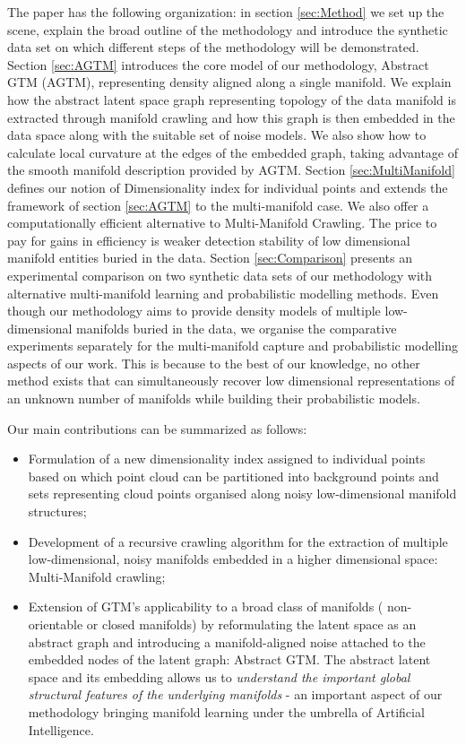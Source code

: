 The paper has the following organization: in section \ref{sec:Method} we set up the scene, explain the broad outline of the methodology and introduce the synthetic data set on which different steps of the methodology  will be demonstrated. Section \ref{sec:AGTM} 
introduces the core model of our methodology, Abstract GTM (AGTM), representing density aligned along a single manifold. We explain how the abstract latent space graph representing topology of the data manifold is extracted through manifold crawling and how this graph is then embedded in the data space along with the suitable set of noise models. We also show how to calculate local curvature at the edges of the embedded graph, taking advantage of the smooth manifold description provided by AGTM.
 Section \ref{sec:MultiManifold} defines our notion of Dimensionality index for individual points and extends the framework of section \ref{sec:AGTM} to the multi-manifold case. We also offer a computationally efficient alternative to Multi-Manifold Crawling. The price to pay for gains in efficiency is weaker detection stability of low dimensional manifold entities buried in the data.
 Section \ref{sec:Comparison} presents an experimental comparison on two synthetic data sets of our methodology with alternative multi-manifold learning and probabilistic modelling methods. Even though our methodology aims to provide density models of multiple low-dimensional manifolds buried in the data, we organise the comparative experiments separately for the multi-manifold capture and probabilistic modelling aspects of our work. This is because to the best of our knowledge, no other method exists that can simultaneously recover low dimensional representations of an unknown number of manifolds while building their probabilistic models.
 
 
Our main contributions can be summarized as follows:
\begin{itemize}
    \item Formulation of a new dimensionality index assigned to individual points based on which point cloud can be partitioned into background points and sets representing cloud points organised along noisy low-dimensional manifold structures;
    \item Development of a recursive crawling algorithm for the extraction of multiple low-dimensional, noisy manifolds embedded in a higher dimensional space: Multi-Manifold crawling;
    \item Extension of GTM's applicability to a broad class of manifolds (\eg{} non-orientable or closed manifolds) by reformulating the latent space as an abstract graph and introducing a manifold-aligned noise attached to the embedded nodes of the latent graph: Abstract GTM. The abstract latent space and its embedding allows us to {\em understand the important global structural features of the underlying manifolds} - an important aspect of our methodology bringing manifold learning under the umbrella of Artificial Intelligence.
\end{itemize}


